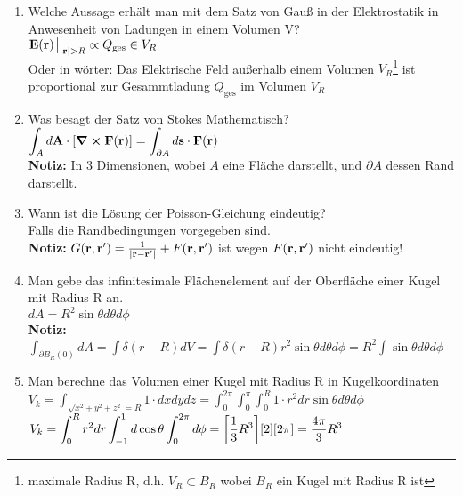 \documentclass{scrartcl}
\newcommand{\rr}[1]{\frac{#1}{\abs{\vb{r}-\vb{r}'}}}
\newcommand{\ds}{\displaystyle}
\begin{document}
\begin{enumerate}
    \item Welche Aussage erhält man mit dem Satz von Gauß in der 
          Elektrostatik in Anwesenheit von Ladungen in einem Volumen V?\\
          $\vb E(\vb r)\eval_{\abs{\vb r} > R}\propto Q_{\text{ges}}\in V_R$\\
          Oder in wörter: Das Elektrische Feld außerhalb einem Volumen 
          $V_R$\footnote{maximale Radius R, d.h. $V_R\subset B_R$ 
                   wobei $B_R$ ein Kugel 
          mit Radius R ist}
          ist
          proportional zur Gesammtladung $Q_{\text{ges}}$ im Volumen $V_R$

    \item Was besagt der Satz von Stokes Mathematisch?\\
          $\ds \int_A d\vb A \cdot \qty[\curl \vb F(\vb r)]=
           \int_{\partial A}d\vb s\cdot \vb F(\vb r)$\\
          \textbf{Notiz:} In 3 Dimensionen, wobei $A$ eine Fläche 
          darstellt,
          und $\partial A$ dessen Rand darstellt.

    \item Wann ist die Lösung der Poisson-Gleichung eindeutig?\\
          Falls die Randbedingungen vorgegeben sind.\\
          \textbf{Notiz:} $G(\vb r, \vb r')=\rr{1} + F(\vb r, \vb r')$ 
          ist wegen $F(\vb r, \vb r')$ nicht eindeutig!
          
    \item Man gebe das infinitesimale Flächenelement auf der Oberfläche 
          einer Kugel mit Radius R an.\\
          $\ds dA = R^2\sin\theta d\theta d\phi$\\
          \textbf{Notiz:} $\ds\int_{\partial B_R(0)} dA=\int\delta(r-R)dV
           =\int \delta(r-R)r^2\sin\theta d\theta d\phi
           =R^2 \int \sin\theta d\theta d\phi$

    \item Man berechne das Volumen einer Kugel mit Radius R 
          in Kugelkoordinaten\\
          $\ds V_k=\int_{\sqrt{x^2+y^2+z^2}=R} 1\cdot dxdydz
           =\int_0^{2\pi}\int_0^\pi\int_0^R 1\cdot r^2dr 
            \sin\theta d\theta d\phi$\\
          $\ds V_k=\int_0^R r^2 dr \int_{-1}^{1} d\cos\theta 
                   \int_0^{2\pi}d\phi
           =\qty[\frac{1}{3}R^3]\qty[2]\qty[2\pi]=\frac{4\pi}{3}R^3$


\end{enumerate}
\end{document}
